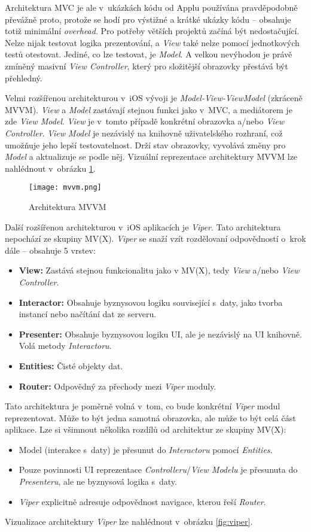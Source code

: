 Architektura MVC je ale v~ukázkách kódu od Applu používána pravděpodobně převážně proto, protože se hodí pro výstižné a krátké ukázky kódu – obsahuje totiž minimální \emph{overhead}. Pro potřeby větších projektů začíná být nedostačující. Nelze nijak testovat logika prezentování, a \emph{View} také nelze pomocí jednotkových testů otestovat. Jediné, co lze testovat, je \emph{Model}. A velkou nevýhodou je právě zmíněný masivní \emph{View Controller}, který pro složitější obrazovky přestává být přehledný.

Velmi rozšířenou architekturou v~iOS vývoji je \emph{Model-View-ViewModel} (zkráceně MVVM). \emph{View} a \emph{Model} zastávají stejnou funkci jako v~MVC, a mediátorem je zde \emph{View Model}. \emph{View} je v~tomto případě konkrétní obrazovka a/nebo \emph{View Controller}. \emph{View Model} je nezávislý na knihovně uživatelského rozhraní, což umožňuje jeho lepší testovatelnost. Drží stav obrazovky, vyvolává změny pro \emph{Model} a aktualizuje se podle něj. Vizuální reprezentace architektury MVVM lze nahlédnout v~obrázku \ref{fig:mvvm}.

\begin{figure}[h]
	\centering
	\texttt{[image: mvvm.png]}
	\caption{Architektura MVVM \cite{ios-architecture-patterns}}
	\label{fig:mvvm}
\end{figure}

Další rozšířenou architekturou v~iOS aplikacích je \emph{Viper}. Tato architektura nepochází ze skupiny MV(X). \emph{Viper} se snaží vzít rozdělovaní odpovědností o~krok dále – obsahuje 5 vrstev:
\begin{itemize}
\item\textbf{View:} Zastává stejnou funkcionalitu jako v MV(X), tedy \emph{View} a/nebo \emph{View Controller}.
\item\textbf{Interactor:} Obsahuje byznysovou logiku související s~daty, jako tvorba instancí nebo načítání dat ze serveru.
\item\textbf{Presenter:} Obsahuje byznysovou logiku UI, ale je nezávislý na UI knihovně. Volá metody \emph{Interactoru}.
\item\textbf{Entities:} Čisté objekty dat.
\item\textbf{Router:} Odpovědný za přechody mezi \emph{Viper} moduly.
\end{itemize}
Tato architektura je poměrně volná v~tom, co bude konkrétní \emph{Viper} modul reprezentovat. Může to být jedna samotná obrazovka, ale může to být celá část aplikace. Lze si všimnout několika rozdílů od architektur ze skupiny MV(X):
\begin{itemize}
\item Model (interakce s~daty) je přesunut do \emph{Interactoru} pomocí \emph{Entities}.
\item Pouze povinnosti UI reprezentace \emph{Controlleru}/\emph{View Modelu} je přesunuta do \emph{Presenteru}, ale ne byznysová logika s~daty.
\item \emph{Viper} explicitně adresuje odpovědnost navigace, kterou řeší \emph{Router}.
\end{itemize}
Vizualizace architektury \emph{Viper} lze nahlédnout v~obrázku \ref{fig:viper}. \cite{ios-architecture-patterns}

